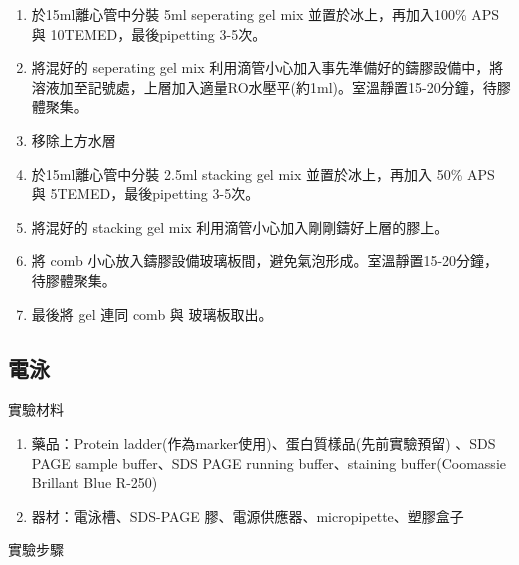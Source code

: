 \begin{enumerate}[label=\arabic*.]
  \item 於15ml離心管中分裝 5ml seperating gel mix 並置於冰上，再加入100\% APS 與 10\mul TEMED，最後pipetting 3-5次。
  \item 將混好的 seperating gel mix 利用滴管小心加入事先準備好的鑄膠設備中，將溶液加至記號處，上層加入適量RO水壓平(約1ml)。室溫靜置15-20分鐘，待膠體聚集。
  \item 移除上方水層
  \item 於15ml離心管中分裝 2.5ml stacking gel mix  並置於冰上，再加入 50\% APS 與 5\mul TEMED，最後pipetting 3-5次。
  \item 將混好的 stacking gel mix 利用滴管小心加入剛剛鑄好上層的膠上。
  \item 將 comb 小心放入鑄膠設備玻璃板間，避免氣泡形成。室溫靜置15-20分鐘，待膠體聚集。
  \item 最後將 gel 連同 comb 與 玻璃板取出。
\end{enumerate}



\subsection{電泳} 
\hspace*{-2em}實驗材料

\begin{enumerate}[label=\arabic*.]
  \item 藥品：Protein ladder(作為marker使用)、蛋白質樣品(先前實驗預留) 、SDS PAGE sample buffer、SDS PAGE running buffer、staining buffer(Coomassie Brillant Blue R-250)
  \item 器材：電泳槽、SDS-PAGE 膠、電源供應器、micropipette、塑膠盒子
\end{enumerate}

\hspace*{-2em}實驗步驟 

